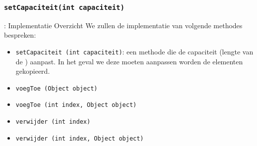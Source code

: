 \subsubsection{\texttt{setCapaciteit(int capaciteit)}}
\begin{frame}{\dsarraylist{}: Implementatie Overzicht}
We zullen de implementatie van volgende methodes bespreken:
\begin{itemize}
 \item \texttt{setCapaciteit (int capaciteit)}: een methode die de capaciteit (lengte van de \dsarray{}) aanpast. In het geval we deze moeten aanpassen worden de elementen gekopieerd.
 \item \texttt{voegToe (Object object)}
 \item \texttt{voegToe (int index, Object object)}
 \item \texttt{verwijder (int index)}
 \item \texttt{verwijder (int index, Object object)}
\end{itemize}
\end{frame}